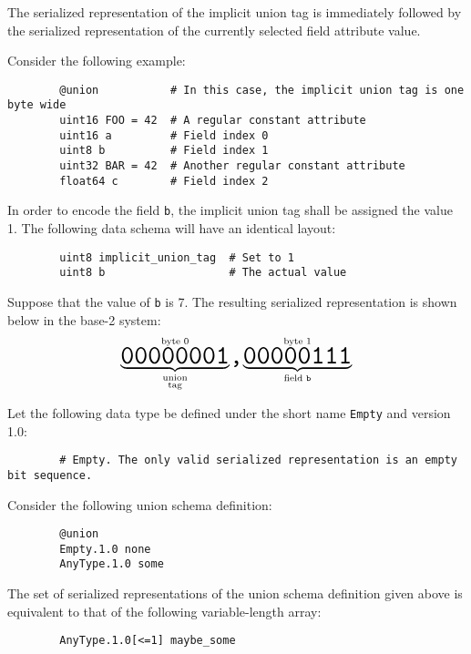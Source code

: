 The serialized representation of the implicit union tag is immediately followed by
the serialized representation of the currently selected field attribute value.

\begin{remark}
    Consider the following example:

    \begin{verbatim}
        @union           # In this case, the implicit union tag is one byte wide
        uint16 FOO = 42  # A regular constant attribute
        uint16 a         # Field index 0
        uint8 b          # Field index 1
        uint32 BAR = 42  # Another regular constant attribute
        float64 c        # Field index 2
    \end{verbatim}

    In order to encode the field \verb|b|, the implicit union tag shall be assigned the value 1.
    The following data schema will have an identical layout:

    \begin{verbatim}
        uint8 implicit_union_tag  # Set to 1
        uint8 b                   # The actual value
    \end{verbatim}

    Suppose that the value of \verb|b| is 7.
    The resulting serialized representation is shown below in the base-2 system:
    $$%
    \overset{\text{byte 0}}{%
        \underbrace{\hugett{00000001}}_{\substack{\text{union} \\ \text{tag}}}%
    }%
    \hugett{,}%
    \overset{\text{byte 1}}{%
        \underbrace{\hugett{00000111}}_{\text{field }\texttt{b}}%
    }
    $$

\end{remark}

\begin{remark}
    Let the following data type be defined under the short name \verb|Empty| and version 1.0:

    \begin{verbatim}
        # Empty. The only valid serialized representation is an empty bit sequence.
    \end{verbatim}

    Consider the following union schema definition:

    \begin{verbatim}
        @union
        Empty.1.0 none
        AnyType.1.0 some
    \end{verbatim}

    The set of serialized representations of the union schema definition given above is equivalent to
    that of the following variable-length array:

    \begin{verbatim}
        AnyType.1.0[<=1] maybe_some
    \end{verbatim}
\end{remark}
